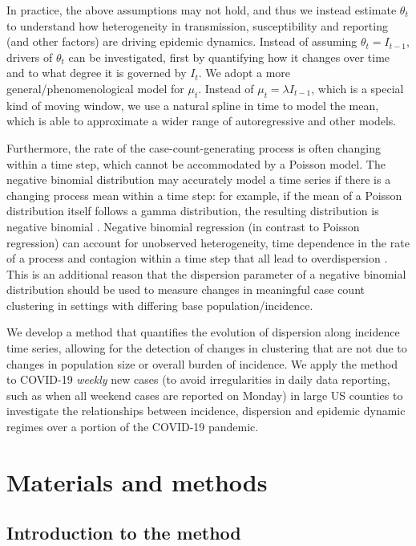 \documentclass[10pt,letterpaper]{article}
\begin{document}
In practice, the above assumptions may not hold, and thus we instead estimate $\theta_t$ to understand how heterogeneity in transmission, susceptibility and reporting (and other factors) are driving epidemic dynamics. 
Instead of assuming $\theta_t = I_{t-1}$, drivers of $\theta_t$ can be investigated, first by quantifying how it changes over time and to what degree it is governed by $I_t$. 
We adopt a more general/phenomenological model for $\mu_t$. 
Instead of $\mu_t = \lambda I_{t-1}$, which is a special kind of moving window, we use a natural spline in time to model the mean, which is able to approximate a wider range of autoregressive and other models. 

Furthermore, the rate of the case-count-generating process is often changing within a time step, which cannot be accommodated by a Poisson model. 
The negative binomial distribution may accurately model a time series if there is a changing process mean within a time step: for example, if the mean of a Poisson distribution itself follows a gamma distribution, the resulting distribution is negative binomial \cite{cook_notes_nodate}. 
Negative binomial regression (in contrast to Poisson regression) can account for unobserved heterogeneity, time dependence in the rate of a process and contagion within a time step that all lead to overdispersion \cite{barron_analysis_1992}.
This is an additional reason that the dispersion parameter of a negative binomial distribution should be used to measure changes in meaningful case count clustering in settings with differing base population/incidence. 

We develop a method that quantifies the evolution of dispersion along incidence time series, allowing for the detection of changes in clustering that are not due to changes in population size or overall burden of incidence.
We apply the method to COVID-19 \emph{weekly} new cases (to avoid irregularities in daily data reporting, such as when all weekend cases are reported on Monday) in large US counties to investigate the relationships between incidence, dispersion and epidemic dynamic regimes over a portion of the COVID-19 pandemic. 

\section*{Materials and methods}
\subsection*{Introduction to the method}
\end{document}
